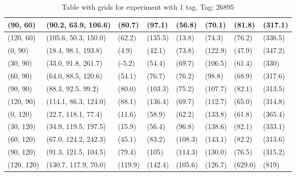 \begin{table}[H]
\begin{tabular}{|l|l|l|l|l|l|l|l|}
    (90, 60)    & (90.2, 63.9, 106.6)   & (80.7)  & (97.1)  & (56.8)   & (70.1)  & (81.8)  & (317.1)  \\ \hline
    (120, 60)   & (105.6, 50.3, 150.0)  & (62.2)  & (135.5) & (13.8)   & (74.3)  & (76.2)  & (336.5)  \\ \hline
    (0, 90)     & (18.4, 98.1, 193.8)   & (4.9)   & (42.1)  & (73.8)   & (122.9) & (47.9)  & (347.2)  \\ \hline
    (30, 90)    & (33.0, 91.8, 261.7)   & (-5.2)  & (54.4)  & (69.7)   & (106.5) & (61.4)  & (330)    \\ \hline
    (60, 90)    & (64.0, 88.5, 120.6)   & (54.1)  & (76.7)  & (76.2)   & (98.8)  & (68.9)  & (317.6)  \\ \hline
    (90, 90)    & (88.3,  92.5, 99.2)   & (80.0)  & (103.3) & (75.2)   & (107.7) & (82.1)  & (313.5)  \\ \hline
    (120, 90)   & (114.1, 86.3, 124.0)  & (88.1)  & (136.4) & (69.7)   & (112.7) & (65.0)  & (314.8)  \\ \hline
    (0, 120)    & (22.7, 118.1, 77.4)   & (11.6)  & (58.9)  & (62.2)   & (133.8) & (61.8)  & (365.4)  \\ \hline
    (30, 120)   & (34.9, 119.5, 197.5)  & (15.9)  & (56.4)  & (96.8)   & (138.6) & (82.1)  & (333.1)  \\ \hline
    (60, 120)   & (67.0, 124.2, 242.3)  & (45.1)  & (83.2)  & (108.3)  & (143.1) & (82.2)  & (313.6)  \\ \hline
    (90, 120)   & (91.3, 121.5, 104.5)  & (79.4)  & (105)   & (114.3)  & (130.0) & (76.5)  & (315.2)  \\ \hline
    (120, 120)  & (130.7, 117.9, 70.0)  & (119.9) & (142.4) & (105.6)  & (126.7) & (629.0) & (819)    \\ \hline
\end{tabular}
\label{Tab:one-tag-experiment-result}
\caption{Table with grids for experiment with 1 tag. Tag: 26895}
\end{table}


